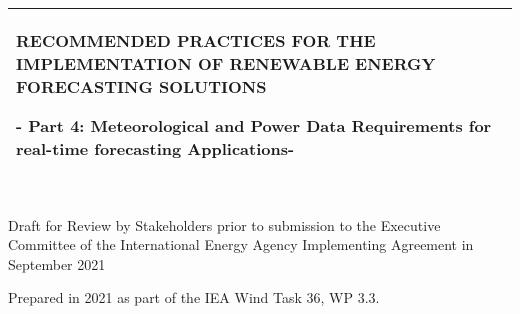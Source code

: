 %
%
%
%
%
\begin{titlepage}
  \addtolength{\hoffset}{0.5\evensidemargin-0.5\oddsidemargin} %
  \noindent%
  \begin{tabular}{@{}p{\textwidth}@{}}
    \toprule[2pt]
    \midrule
    \vspace{0.2cm}
    \begin{center}
    \Huge{\textbf{
RECOMMENDED PRACTICES FOR THE IMPLEMENTATION OF
 RENEWABLE ENERGY FORECASTING SOLUTIONS%
    }}
    \end{center}
    \begin{center}
      \Large{
        - Part 4:  Meteorological and Power Data Requirements for real-time forecasting Applications-%
      }
    \end{center}
    \vspace{0.2cm}\\
    \midrule
    \toprule[2pt]
  \end{tabular}
  \vspace{4 cm}
  \begin{center}
    {\large
      \color{blue}{1. DRAFT EDITION 2021} \\ 
    }
    \vspace{0.2cm}
    {\Large
      Draft for Review by Stakeholders prior to submission to the Executive Committee of the International Energy Agency Implementing Agreement in September 2021%
      \\
    }
  \end{center}
  \vfill
  \begin{center}
  Prepared in 2021 as part of the IEA Wind Task 36, WP 3.3.
  \end{center}
\end{titlepage}
\clearpage